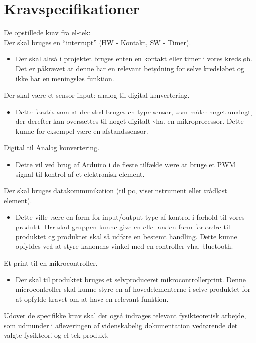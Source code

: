 \section{Kravspecifikationer}

De opstillede krav fra el-tek:\\

Der skal bruges en “interrupt” (HW - Kontakt, SW - Timer).
\begin{itemize}
\item Der skal altså i projektet bruges enten en kontakt eller timer i vores kredsløb. Det er påkrævet at denne har en relevant betydning for selve kredsløbet og ikke har en meningsløs funktion.
\end{itemize}



Der skal være et sensor input: analog til digital konvertering.
\begin{itemize}
\item Dette forstås som at der skal bruges en type sensor, som måler noget analogt, der derefter kan oversættes til noget digitalt vha. en mikroprocessor. Dette kunne for eksempel være en afstandssensor.
\end{itemize}

Digital til Analog konvertering.
\begin{itemize}
\item Dette vil ved brug af Arduino i de fleste tilfælde være at bruge et PWM signal til kontrol af et elektronisk element.
\end{itemize}


Der skal bruges datakommunikation (til pc, viserinstrument eller trådløst element).
\begin{itemize}
\item Dette ville være en form for input/output type af kontrol i forhold til vores produkt. Her skal gruppen kunne give en eller anden form for ordre til produktet og produktet skal så udføre en bestemt handling. Dette kunne opfyldes ved at styre kanonens vinkel med en controller vha. bluetooth.
\end{itemize}

Et print til en mikrocontroller.
\begin{itemize}
\item Der skal til produktet bruges et selvproduceret mikrocontrollerprint. Denne microcontroller skal kunne styre en af hovedelementerne i selve produktet for at opfylde kravet om at have en relevant funktion.
\end{itemize}

Udover de specifikke krav skal der også indrages relevant fysikteoretisk arbejde, som udmunder i afleveringen af videnskabelig dokumentation vedrørende det valgte fysikteori og el-tek produkt.
